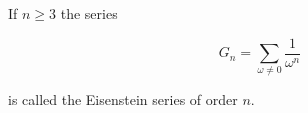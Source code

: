 If $n \geq 3$ the series

$$G_n = \sum_{\omega \neq 0} \frac{1}{\omega^n}$$

is called the Eisenstein series of order $n$.
